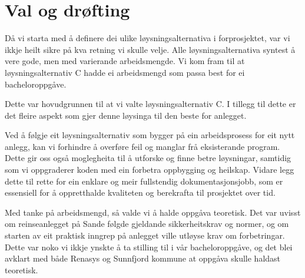 \section{Val og drøfting}

Då vi starta med å definere dei ulike løysningsalternativa i forprosjektet, var vi
ikkje heilt sikre på kva retning vi skulle velje. Alle løysningsalternativa syntest å vere gode,
men med varierande arbeidsmengde. Vi kom fram til at løysningsalternativ C hadde ei arbeidsmengd
som passa best for ei bacheloroppgåve.

Dette var hovudgrunnen til at vi valte løysningsalternativ C.
I tillegg til dette er det fleire aspekt som gjer denne løysinga til den beste for anlegget.

Ved å følgje eit løysningsalternativ som bygger på ein arbeidsprosess for eit nytt anlegg, 
kan vi forhindre å overføre feil og manglar frå eksisterande program. 
Dette gir oss også moglegheita til å utforske og finne betre løysningar, 
samtidig som vi oppgraderer koden med ein forbetra oppbygging og heilskap.
Vidare legg dette til rette for ein enklare og meir fullstendig dokumentasjonsjobb, 
som er essensiell for å oppretthalde kvaliteten og berekrafta til prosjektet over tid.

Med tanke på arbeidsmengd, så valde vi å halde oppgåva teoretisk.
Det var uvisst om reinseanlegget på Sande følgde gjeldande sikkerheitskrav og normer,
og om starten av eit praktisk inngrep på anlegget ville utløyse krav om forbetringar.
Dette var noko vi ikkje ynskte å ta stilling til i vår bacheloroppgåve, og det blei avklart
med både Renasys og Sunnfjord kommune at oppgåva skulle haldast teoretisk.

